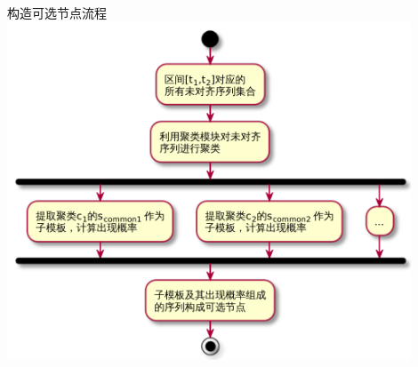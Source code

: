 \begin{frame}[label=sec-2-22]{构造可选节点流程}
\includegraphics[width=0.9\textwidth]{subtemplate}
\end{frame}
